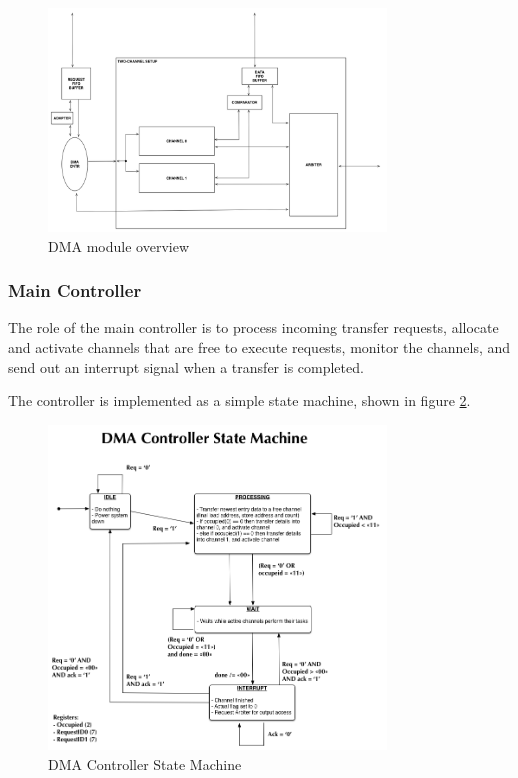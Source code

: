 \begin{figure}[htb]
    \centering
    \includegraphics[width=0.8\textwidth]{Figures/DMA/TopViewFinalSimple}
    \caption{DMA module overview}
    \label{fig:DMATopView}
\end{figure}

\subsubsection{Main Controller}
The role of the main controller is to process incoming transfer requests, allocate and activate
channels that are free to execute requests, monitor the channels, and send out an interrupt signal
when a transfer is completed. 

The controller is implemented as a simple state machine, shown in figure \ref{fig:DMAControllerStateMachine}.

\begin{figure}[htb]
    \centering
    \includegraphics[width=0.8\textwidth]{Figures/DMA/StateMachineFinal}
    \caption{DMA Controller State Machine}
    \label{fig:DMAControllerStateMachine}
\end{figure}

